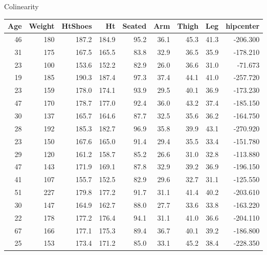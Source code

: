 \documentclass[
  ignorenonframetext,
]{beamer}
\begin{document}
\begin{frame}{}
\protect\hypertarget{section-5}{}
\begin{center}
\Huge Colinearity
\end{center}
\end{frame}

\begin{frame}{}
\protect\hypertarget{section-6}{}
\begin{table}
\centering\begingroup\fontsize{8}{10}\selectfont

\begin{tabular}[t]{r|r|r|r|r|r|r|r|r}
\hline
Age & Weight & HtShoes & Ht & Seated & Arm & Thigh & Leg & hipcenter\\
\hline
46 & 180 & 187.2 & 184.9 & 95.2 & 36.1 & 45.3 & 41.3 & -206.300\\
\hline
31 & 175 & 167.5 & 165.5 & 83.8 & 32.9 & 36.5 & 35.9 & -178.210\\
\hline
23 & 100 & 153.6 & 152.2 & 82.9 & 26.0 & 36.6 & 31.0 & -71.673\\
\hline
19 & 185 & 190.3 & 187.4 & 97.3 & 37.4 & 44.1 & 41.0 & -257.720\\
\hline
23 & 159 & 178.0 & 174.1 & 93.9 & 29.5 & 40.1 & 36.9 & -173.230\\
\hline
47 & 170 & 178.7 & 177.0 & 92.4 & 36.0 & 43.2 & 37.4 & -185.150\\
\hline
30 & 137 & 165.7 & 164.6 & 87.7 & 32.5 & 35.6 & 36.2 & -164.750\\
\hline
28 & 192 & 185.3 & 182.7 & 96.9 & 35.8 & 39.9 & 43.1 & -270.920\\
\hline
23 & 150 & 167.6 & 165.0 & 91.4 & 29.4 & 35.5 & 33.4 & -151.780\\
\hline
29 & 120 & 161.2 & 158.7 & 85.2 & 26.6 & 31.0 & 32.8 & -113.880\\
\hline
47 & 143 & 171.9 & 169.1 & 87.8 & 32.9 & 39.2 & 36.9 & -196.150\\
\hline
41 & 107 & 155.7 & 152.5 & 82.9 & 29.6 & 32.7 & 31.1 & -125.550\\
\hline
51 & 227 & 179.8 & 177.2 & 91.7 & 31.1 & 41.4 & 40.2 & -203.610\\
\hline
30 & 147 & 164.9 & 162.7 & 88.0 & 27.7 & 33.6 & 33.8 & -163.220\\
\hline
22 & 178 & 177.2 & 176.4 & 94.1 & 31.1 & 41.0 & 36.6 & -204.110\\
\hline
67 & 166 & 177.1 & 175.3 & 89.4 & 36.7 & 40.1 & 39.2 & -186.800\\
\hline
25 & 153 & 173.4 & 171.2 & 85.0 & 33.1 & 45.2 & 38.4 & -228.350\\

\end{tabular}
\end{table}
\end{frame}
\end{document}
